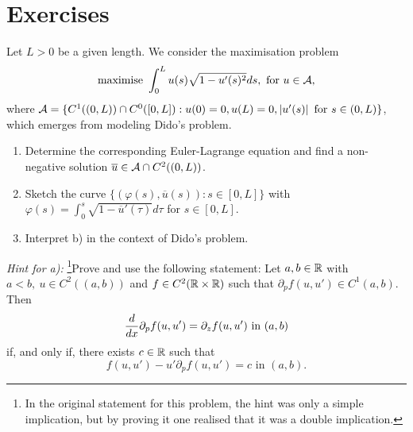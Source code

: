 \section{Exercises}

\begin{ex}

  Let $L > 0$ be a given length. We consider the maximisation problem
  \[
    \text{maximise } \int_0^L u(s)\sqrt{1 - u'(s)^2}ds, \text{ for } u \in \mathcal{A},
  \]
  where $\mathcal{A} = \{C^1((0, L)) \cap C^0([0, L]) : u(0) = 0, u(L) = 0,
  \left\vert{u'(s)}\right\vert \text{ for } s \in (0, L)\}$, which emerges from modeling Dido's
  problem.

  \begin{enumerate}
    \item Determine the corresponding Euler-Lagrange equation and find a
      non-negative solution $\overline{u} \in \mathcal{A} \cap C^2((0, L))$.
    \item Sketch the curve $\{(\varphi(s), \overline{u}(s)) : s \in [0, L]\}$
      with $\varphi(s) = \int_0^s \sqrt{1 - \overline{u}'(\tau)}d\tau$ for $s
      \in [0, L]$.
    \item Interpret b) in the context of Dido's problem.
  \end{enumerate}

  \textit{Hint for a):} \footnote{In the original statement for this problem,
  the hint was only a simple implication, but by proving it one realised that
it was a double implication.}Prove and use the following statement: Let $a, b
\in \mathbb{R}$ with $a < b,\ u \in C^2((a, b))$ and $f \in C^2(\mathbb{R} \times \mathbb{R})$ such
that $\partial_p f(u, u') \in C^1(a, b)$. Then
  \[
    \frac{d}{dx} \partial_p f(u, u') = \partial_z f(u, u')\text{ in } (a, b)
  \]
  if, and only if, there exists $c \in \mathbb{R}$ such that
  \[
    f(u, u') - u' \partial_p f(u, u') = c\text{ in } (a, b).
  \]
\end{ex}


